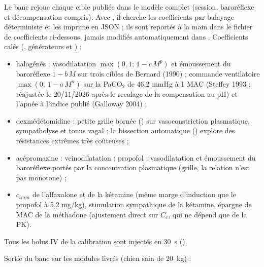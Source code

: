 Le banc  rejoue chaque cible publiée dans le modèle complet
(session, baroréflexe et décompensation compris). Avec , il cherche les coefficients par balayage déterministe et
les imprime en JSON ; ils sont reportés à la main dans le fichier de coefficients ci-dessous, jamais modifiés automatiquement dans .
Coefficients calés (, générateurs  et ) :
\begin{itemize}
\item halogénés : vasodilatation $\max(0{,}1;\,1 - c\,M^p)$ et émoussement du baroréflexe $1 - b\,M$ sur trois cibles de Bernard (1990) ;
commande ventilatoire $\max(0;\,1 - a\,M^n)$ sur la PaCO$_2$ de 46,2 mmHg à 1 MAC (Steffey 1993 ; réajustée le 20/11/2026 après le recalage de la compensation au pH) et l'apnée à l'indice publié (Galloway 2004) ;
\item dexmédétomidine : petite grille bornée () sur vasoconstriction plasmatique, sympatholyse et tonus vagal ;
la bissection automatique () explore des résistances extrêmes très coûteuses ;
\item acépromazine : veinodilatation ; propofol : vasodilatation et émoussement du baroréflexe portés par la concentration plasmatique
(grille, la relation n'est pas monotone) ;
\item $c_{imm}$ de l'alfaxalone et de la kétamine (même marge d'induction que le propofol à 5,2 mg/kg), stimulation sympathique de la kétamine,
épargne de MAC de la méthadone (ajustement direct sur $C_e$, qui ne dépend que de la PK).
\end{itemize}
Tous les bolus IV de la calibration sont injectés en \SI{30}{s} ().

Sortie du banc sur les modules livrés (chien sain de \SI{20}{kg}) :

